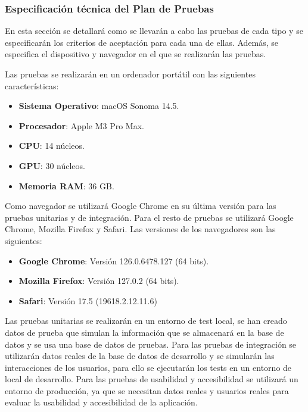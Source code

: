 \subsubsection{Especificación técnica del Plan de Pruebas}
En esta sección se detallará como se llevarán a cabo las pruebas de cada tipo y se especificarán los criterios de aceptación para cada una de ellas.
Además, se especifica el dispositivo y navegador en el que se realizarán las pruebas.

Las pruebas se realizarán en un ordenador portátil con las siguientes características:
\begin{itemize}
    \item \textbf{Sistema Operativo}: macOS Sonoma 14.5.
    \item \textbf{Procesador}: Apple M3 Pro Max.
    \item \textbf{CPU}: 14 núcleos.
    \item \textbf{GPU}: 30 núcleos.
    \item \textbf{Memoria RAM}: 36 GB.
\end{itemize}

Como navegador se utilizará Google Chrome en su última versión para las pruebas unitarias y de integración.
Para el resto de pruebas se utilizará Google Chrome, Mozilla Firefox y Safari.
Las versiones de los navegadores son las siguientes:
\begin{itemize}
    \item \textbf{Google Chrome}: Versión 126.0.6478.127 (64 bits).
    \item \textbf{Mozilla Firefox}: Versión 127.0.2 (64 bits).
    \item \textbf{Safari}: Versión 17.5 (19618.2.12.11.6)
\end{itemize}

Las pruebas unitarias se realizarán en un entorno de test local, se han creado datos de prueba que simulan la información que se almacenará en la base de datos y se usa una base de datos de pruebas.
Para las pruebas de integración se utilizarán datos reales de la base de datos de desarrollo y se simularán las interacciones de los usuarios, para ello se ejecutarán los tests en un entorno de local de desarrollo.
Para las pruebas de usabilidad y accesibilidad se utilizará un entorno de producción, ya que se necesitan datos reales y usuarios reales para evaluar la usabilidad y accesibilidad de la aplicación.


